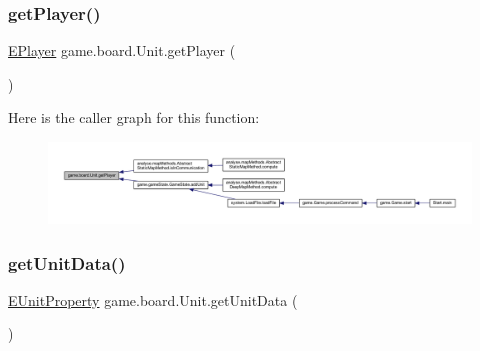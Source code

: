 \mbox{\label{classgame_1_1board_1_1_unit_a4af824248a4efde17c956b608b338591}} 
\subsubsection{\texorpdfstring{get\+Player()}{getPlayer()}}
{\footnotesize\ttfamily \mbox{\hyperlink{enumgame_1_1_e_player}{E\+Player}} game.\+board.\+Unit.\+get\+Player (\begin{DoxyParamCaption}{ }\end{DoxyParamCaption})\hspace{0.3cm}{\ttfamily [inline]}}

Here is the caller graph for this function\+:
\nopagebreak
\begin{figure}[H]
\begin{center}
\leavevmode
\includegraphics[width=350pt]{classgame_1_1board_1_1_unit_a4af824248a4efde17c956b608b338591_icgraph}
\end{center}
\end{figure}
\mbox{\label{classgame_1_1board_1_1_unit_a165d186d9ffb91527d90807134dbe212}} 
\subsubsection{\texorpdfstring{get\+Unit\+Data()}{getUnitData()}}
{\footnotesize\ttfamily \mbox{\hyperlink{enumrule_engine_1_1entity_1_1_e_unit_property}{E\+Unit\+Property}} game.\+board.\+Unit.\+get\+Unit\+Data (\begin{DoxyParamCaption}{ }\end{DoxyParamCaption})\hspace{0.3cm}{\ttfamily [inline]}}

